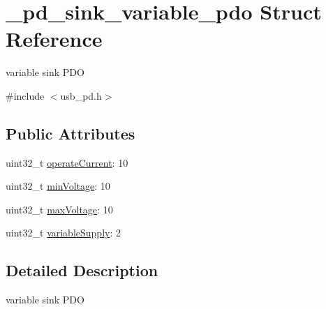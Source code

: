 \hypertarget{struct__pd__sink__variable__pdo}{\section{\-\_\-pd\-\_\-sink\-\_\-variable\-\_\-pdo Struct Reference}
\label{struct__pd__sink__variable__pdo}
}


variable sink P\-D\-O  




{\ttfamily \#include $<$usb\-\_\-pd.\-h$>$}

\subsection*{Public Attributes}
\begin{DoxyCompactItemize}
\item 
uint32\-\_\-t \hyperlink{struct__pd__sink__variable__pdo_a145ba35b4f033f771ae9b72c018181d5}{operate\-Current}\-: 10
\item 
uint32\-\_\-t \hyperlink{struct__pd__sink__variable__pdo_a0ee666a778180c34bc4e0119ee3f51a3}{min\-Voltage}\-: 10
\item 
uint32\-\_\-t \hyperlink{struct__pd__sink__variable__pdo_adc5d6a90b282fc222e180b79aef74e65}{max\-Voltage}\-: 10
\item 
uint32\-\_\-t \hyperlink{struct__pd__sink__variable__pdo_a8ed1cefb52db381deddc243bd7d702e3}{variable\-Supply}\-: 2
\end{DoxyCompactItemize}


\subsection{Detailed Description}
variable sink P\-D\-O 

